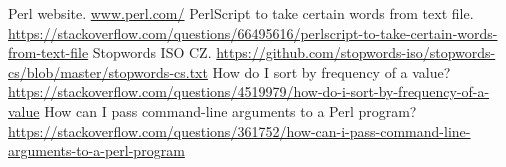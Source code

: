 \documentclass[a4paper,11pt]{article}
\begin{document}
    \vspace{10pt}
    \begin{thebibliography}{9}
            Perl website. \url{www.perl.com/}
            PerlScript to take certain words from text file. \url{https://stackoverflow.com/questions/66495616/perlscript-to-take-certain-words-from-text-file}
            Stopwords ISO CZ. \url{https://github.com/stopwords-iso/stopwords-cs/blob/master/stopwords-cs.txt}
            How do I sort by frequency of a value? \url{https://stackoverflow.com/questions/4519979/how-do-i-sort-by-frequency-of-a-value}
            How can I pass command-line arguments to a Perl program? \url{https://stackoverflow.com/questions/361752/how-can-i-pass-command-line-arguments-to-a-perl-program}
    \end{thebibliography}
\end{document}
